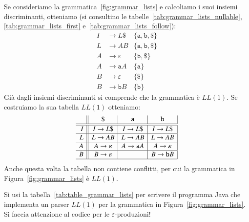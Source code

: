 Se consideriamo la grammatica~\eqref{fig:grammar_lists} e calcoliamo
i suoi insiemi discriminanti, otteniamo (si consultino le
tabelle~\eqref{tab:grammar_lists_nullable}, \eqref{tab:grammar_lists_first}
e~\eqref{tab:grammar_lists_follow}):
%
\begin{align*}
  I&\to L\mathtt{\$} & \{\mathtt{a},\mathtt{b},\mathtt{\$}\}\\
  L&\to AB & \{\mathtt{a},\mathtt{b},\mathtt{\$}\}\\
  A&\to\varepsilon & \{\mathtt{b},\mathtt{\$}\}\\
  A&\to\mathtt{a}A & \{\mathtt{a}\}\\
  B&\to\varepsilon & \{\mathtt{\$}\}\\
  B&\to\mathtt{b}B & \{\mathtt{b}\}
\end{align*}
%
Gi\`a dagli insiemi discriminanti si comprende che la grammatica \`e
$\mathit{LL}(1)$. Se costruiamo la sua tabella $\mathit{LL}(1)$ otteniamo:
%
\begin{equation}\label{tab:table_grammar_lists}
\begin{array}{r||c|c|c|}
 & \mathtt{\$} & \mathtt{a} & \mathtt{b} \\\hline\hline
\mathit{I} & I\to L\mathtt{\$} & I\to L\mathtt{\$} & I\to L\mathtt{\$}\\\hline
\mathit{L} & L\to AB & L\to AB & L\to AB\\\hline
\mathit{A} & A\to\varepsilon & A\to\mathtt{a}A & A\to\varepsilon\\\hline
\mathit{B} & B\to\varepsilon & & B\to\mathtt{b}B\\\hline
\end{array}
\end{equation}
Anche questa volta la tabella non contiene conflitti, per cui la grammatica
in Figura~\ref{fig:grammar_lists} \`e $\mathit{LL}(1)$.
%
\begin{exercise}\label{ex:parser_ll1}
Si usi la tabella~\eqref{tab:table_grammar_lists} per scrivere
il programma Java che implementa un parser $\mathit{LL}(1)$ per la
grammatica in Figura~\ref{fig:grammar_lists}. Si faccia attenzione
al codice per le $\varepsilon$-produzioni!
\end{exercise}

